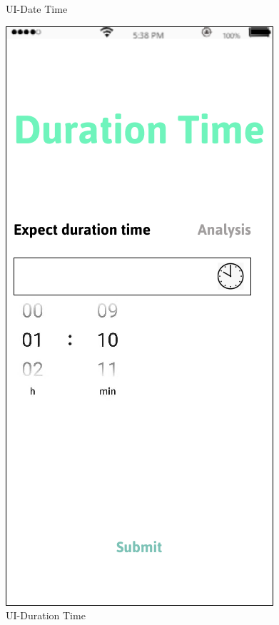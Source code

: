\documentclass[a4paper,12pt]{report}
\begin{document}
\begin{figure}[H]
\begin{minipage}[t]{0.56\linewidth}
		\caption{UI-Date Time}
		\label{UI-Date Time}
	\end{minipage}%
	\begin{minipage}[t]{0.56\linewidth}
		\centering
		\includegraphics[scale=0.5]{UI-Duration Time.png}
		\caption{UI-Duration Time}
		\label{UI-Duration Time}
	\end{minipage}
\end{figure}
\end{document}
